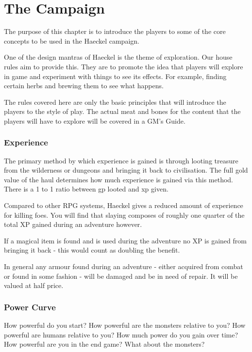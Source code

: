 \chapter{The Campaign}\label{campaign}
\newpage

\begin{multicols}{2}



The purpose of this chapter is to introduce the players to some of the core concepts to be used in the Haeckel campaign. 

One of the design mantras of Haeckel is the theme of exploration. Our house rules aim to provide this. They are to promote the idea that players will explore in game and experiment with things to see its effects. For example, finding certain herbs and brewing them to see what happens.
\begin{framed}\centering
The rules covered here are only the basic principles that will introduce the players to the style of play. The actual meat and bones for the content that the players will have to explore will be covered in a GM's Guide.
\end{framed}
\subsection{Experience}

The primary method by which experience is gained is through looting treasure from the wilderness or dungeons and bringing it back to civilisation. The full gold value of the haul determines how much experience is gained via this method. There is a 1 to 1 ratio between gp looted and xp given. 

Compared to other RPG systems, Haeckel gives a reduced amount of experience for killing foes. You will find that slaying composes of roughly one quarter of the total XP gained during an adventure however. 

If a magical item is found and is used during the adventure no XP is gained from bringing it back - this would count as doubling the benefit.

In general any armour found during an adventure - either acquired from combat or found in some fashion - will be damaged and be in need of repair. It will be valued at half price.

\subsection{Power Curve} How powerful do you start? How powerful are the monsters relative to you? How powerful are humans relative to you? How much power do you gain over time? How powerful are you in the end game? What about the monsters? 


\end{multicols}
